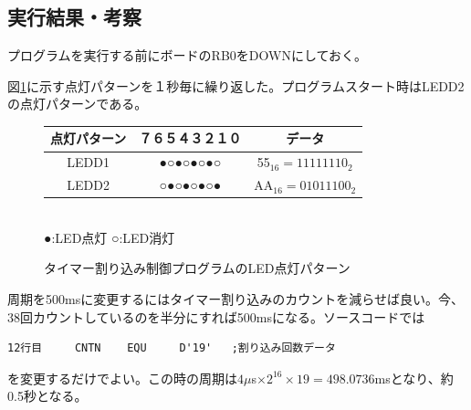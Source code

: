 \documentclass[a4paper,12pt]{ujarticle}
\begin{document}
  \subsection{実行結果・考察}
  プログラムを実行する前にボードのRB0をDOWNにしておく。

  図\ref{fig:timer-int-led}に示す点灯パターンを１秒毎に繰り返した。プログラムスタート時はLEDD2の点灯パターンである。

  \begin{figure}[htbp]
    \begin{center}
       \begin{tabular}{c|c|c}\hline
点灯パターン&７６５４３２１０ & データ \\ \hline
      LEDD1 &●○●○●○●○ & 55$_{16}=11111110_2$ \\
      LEDD2 &○●○●○●○● & AA$_{16}=01011100_2$\\ \hline
       \end{tabular}\\
      ●:LED点灯 ○:LED消灯
    \end{center}
   \caption{タイマー割り込み制御プログラムのLED点灯パターン}
   \label{fig:timer-int-led}
  \end{figure}


  周期を500msに変更するにはタイマー割り込みのカウントを減らせば良い。今、38回カウントしているのを半分にすれば500msになる。ソースコードでは
      \begin{lstlisting}[basicstyle=\ttfamily\footnotesize, frame=single]
12行目     CNTN    EQU     D'19'   ;割り込み回数データ
      \end{lstlisting}
      を変更するだけでよい。この時の周期は$4\mu$s$\times 2^{16}\times 19=498.0736$msとなり、約0.5秒となる。
\end{document}
